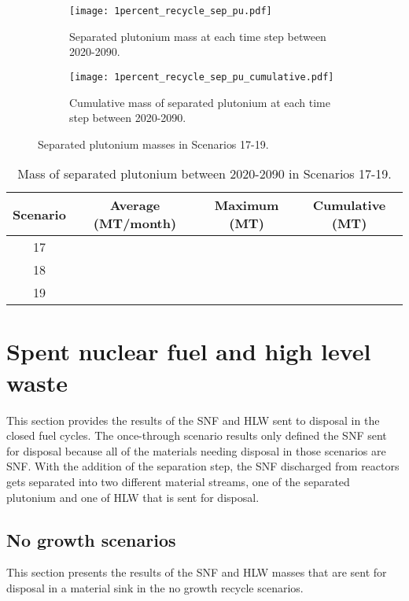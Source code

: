 \begin{figure}[h!]
    \centering
    \begin{subfigure}[b]{0.49\textwidth}
        \centering
        \texttt{[image: 1percent\_recycle\_sep\_pu.pdf]}
        \caption{Separated plutonium mass 
        at each time step between 2020-2090.}
        \label{fig:1percent_recycle_sep_pu_all}
    \end{subfigure}
    \hfill
    \begin{subfigure}[b]{0.49\textwidth}
        \centering
        \texttt{[image: 1percent\_recycle\_sep\_pu\_cumulative.pdf]}
        \caption{Cumulative mass of separated plutonium 
        at each time step between 2020-2090.}
        \label{fig:1percent_recycle_sep_pu_cumulative}
    \end{subfigure}
       \caption{Separated plutonium masses in Scenarios 17-19.}
       \label{fig:1percent_recycle_sep_pu}
\end{figure}

\begin{table}[h!]
    \centering 
    \caption{Mass of separated plutonium between 2020-2090 in Scenarios 
    17-19.}
    \label{tab:sep_pu_17-19}
    \begin{tabular}{c c c c}
        \hline 
        Scenario & Average (MT/month) & Maximum (MT) & Cumulative (MT) \\
        \hline
        17 &  &  & \\
        18 &  &  & \\
        19 &  &  & \\
        \hline
    \end{tabular}
\end{table}


\section{Spent nuclear fuel and high level waste}
This section provides the results of the \gls{SNF} and \gls{HLW} sent 
to disposal in the closed fuel cycles. The once-through scenario 
results only defined the \gls{SNF} sent for disposal because all 
of the materials needing disposal in those scenarios are \gls{SNF}. 
With the addition of the separation step, the \gls{SNF} discharged 
from reactors gets separated into two different material streams, 
one of the separated plutonium and one of \gls{HLW} that is sent 
for disposal.

\subsection{No growth scenarios}
This section presents the results of the \gls{SNF} and 
\gls{HLW} masses that are sent for disposal in a 
material sink in the no growth recycle scenarios. 
